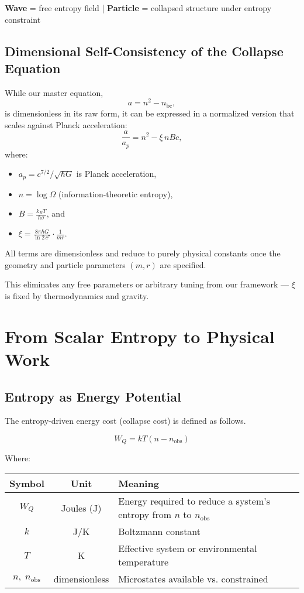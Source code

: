 \documentclass[12pt]{article}
\begin{document}
\begin{center}
\textbf{Wave} = free entropy field \quad | \quad \textbf{Particle} = collapsed structure under entropy constraint
\end{center}

\subsection*{Dimensional Self-Consistency of the Collapse Equation}

While our master equation,
\[
a = n^2 - n_{\text{bc}},
\]
is dimensionless in its raw form, it can be expressed in a normalized version that scales against Planck acceleration:
\[
\frac{a}{a_p} = n^2 - \xi \, n B c,
\]
where:
\begin{itemize}
    \item $a_p = c^{7/2}/\sqrt{\hbar G}$ is Planck acceleration,
    \item $n = \log \Omega$ (information-theoretic entropy),
    \item $B = \frac{k_B T}{\hbar \sigma}$, and
    \item $\xi = \frac{8\pi \hbar G}{\ln 2 \, c^7} \cdot \frac{1}{m r}$.
\end{itemize}

All terms are dimensionless and reduce to purely physical constants once the geometry and particle parameters $(m, r)$ are specified.

This eliminates any free parameters or arbitrary tuning from our framework — $\xi$ is fixed by thermodynamics and gravity.


\section{From Scalar Entropy to Physical Work}

\subsection{Entropy as Energy Potential}

The entropy-driven energy cost (collapse cost) is defined as follows.

\[
W_Q = kT(n - n_{\text{obs}})
\]

\noindent
Where:

\begin{center}
\begin{tabular}{|c|c|p{10cm}|}
\hline
\textbf{Symbol} & \textbf{Unit} & \textbf{Meaning} \\
\hline
$W_Q$ & Joules (J) & Energy required to reduce a system’s entropy from $n$ to $n_{\text{obs}}$ \\
\hline
$k$ & J/K & Boltzmann constant \\
\hline
$T$ & K & Effective system or environmental temperature \\
\hline
$n,\; n_{\text{obs}}$ & dimensionless & Microstates available vs. constrained \\
\hline
\end{tabular}
\end{center}
\end{document}
